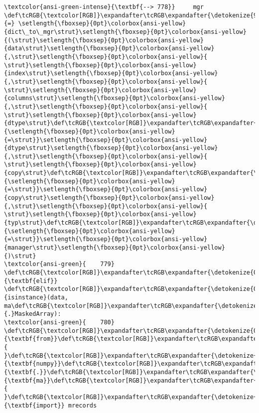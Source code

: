 \documentclass[11pt]{article}
\begin{document}
\begin{Verbatim}[commandchars=\\\{\}, frame=single, framerule=2mm, rulecolor=\color{outerrorbackground}]
\textcolor{ansi-green-intense}{\textbf{--> 778}}     mgr \def\tcRGB{\textcolor[RGB]}\expandafter\tcRGB\expandafter{\detokenize{98,98,98}}{=} \setlength{\fboxsep}{0pt}\colorbox{ansi-yellow}{dict\_to\_mgr\strut}\setlength{\fboxsep}{0pt}\colorbox{ansi-yellow}{(\strut}\setlength{\fboxsep}{0pt}\colorbox{ansi-yellow}{data\strut}\setlength{\fboxsep}{0pt}\colorbox{ansi-yellow}{,\strut}\setlength{\fboxsep}{0pt}\colorbox{ansi-yellow}{ \strut}\setlength{\fboxsep}{0pt}\colorbox{ansi-yellow}{index\strut}\setlength{\fboxsep}{0pt}\colorbox{ansi-yellow}{,\strut}\setlength{\fboxsep}{0pt}\colorbox{ansi-yellow}{ \strut}\setlength{\fboxsep}{0pt}\colorbox{ansi-yellow}{columns\strut}\setlength{\fboxsep}{0pt}\colorbox{ansi-yellow}{,\strut}\setlength{\fboxsep}{0pt}\colorbox{ansi-yellow}{ \strut}\setlength{\fboxsep}{0pt}\colorbox{ansi-yellow}{dtype\strut}\def\tcRGB{\textcolor[RGB]}\expandafter\tcRGB\expandafter{\detokenize{98,98,98}}{\setlength{\fboxsep}{0pt}\colorbox{ansi-yellow}{=\strut}}\setlength{\fboxsep}{0pt}\colorbox{ansi-yellow}{dtype\strut}\setlength{\fboxsep}{0pt}\colorbox{ansi-yellow}{,\strut}\setlength{\fboxsep}{0pt}\colorbox{ansi-yellow}{ \strut}\setlength{\fboxsep}{0pt}\colorbox{ansi-yellow}{copy\strut}\def\tcRGB{\textcolor[RGB]}\expandafter\tcRGB\expandafter{\detokenize{98,98,98}}{\setlength{\fboxsep}{0pt}\colorbox{ansi-yellow}{=\strut}}\setlength{\fboxsep}{0pt}\colorbox{ansi-yellow}{copy\strut}\setlength{\fboxsep}{0pt}\colorbox{ansi-yellow}{,\strut}\setlength{\fboxsep}{0pt}\colorbox{ansi-yellow}{ \strut}\setlength{\fboxsep}{0pt}\colorbox{ansi-yellow}{typ\strut}\def\tcRGB{\textcolor[RGB]}\expandafter\tcRGB\expandafter{\detokenize{98,98,98}}{\setlength{\fboxsep}{0pt}\colorbox{ansi-yellow}{=\strut}}\setlength{\fboxsep}{0pt}\colorbox{ansi-yellow}{manager\strut}\setlength{\fboxsep}{0pt}\colorbox{ansi-yellow}{)\strut}
\textcolor{ansi-green}{    779} \def\tcRGB{\textcolor[RGB]}\expandafter\tcRGB\expandafter{\detokenize{0,135,0}}{\textbf{elif}} \def\tcRGB{\textcolor[RGB]}\expandafter\tcRGB\expandafter{\detokenize{0,135,0}}{isinstance}(data, ma\def\tcRGB{\textcolor[RGB]}\expandafter\tcRGB\expandafter{\detokenize{98,98,98}}{.}MaskedArray):
\textcolor{ansi-green}{    780}     \def\tcRGB{\textcolor[RGB]}\expandafter\tcRGB\expandafter{\detokenize{0,135,0}}{\textbf{from}}\def\tcRGB{\textcolor[RGB]}\expandafter\tcRGB\expandafter{\detokenize{188,188,188}}{ }\def\tcRGB{\textcolor[RGB]}\expandafter\tcRGB\expandafter{\detokenize{0,0,255}}{\textbf{numpy}}\def\tcRGB{\textcolor[RGB]}\expandafter\tcRGB\expandafter{\detokenize{0,0,255}}{\textbf{.}}\def\tcRGB{\textcolor[RGB]}\expandafter\tcRGB\expandafter{\detokenize{0,0,255}}{\textbf{ma}}\def\tcRGB{\textcolor[RGB]}\expandafter\tcRGB\expandafter{\detokenize{188,188,188}}{ }\def\tcRGB{\textcolor[RGB]}\expandafter\tcRGB\expandafter{\detokenize{0,135,0}}{\textbf{import}} mrecords


\end{Verbatim}
\end{document}
